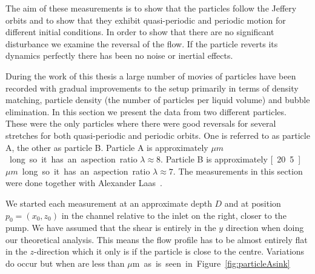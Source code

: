 The aim of these measurements is to show that the particles follow the Jeffery orbits and to show that they exhibit quasi-periodic and periodic motion for different initial conditions. In order to show that there are no significant disturbance we examine the reversal of the flow. If the particle reverts its dynamics perfectly there has been no noise or inertial effects.

During the work of this thesis a large number of movies of particles have been recorded with gradual improvements to the setup primarily in terms of density matching, particle density (the number of particles per liquid volume) and  bubble elimination. In this section we present the data from two different particles. These were the only particles where there were good reversals for several stretches for both quasi-periodic and periodic orbits. One is referred to as particle A, the other as particle B. Particle A is approximately \unit[24]{$\mu m$} long so it has an aspection ratio $\lambda \approx 8$. Particle B is approximately \unit[20.5]{$\mu m$} long so it has an aspection ratio $\lambda \approx 7$. The measurements in this section were done together with Alexander Laas~\cite{alexanderThesis}.

We started each measurement at an approximate depth $D$ and at position $p_0 = (x_0, z_0)$ in the channel relative to the inlet on the right, closer to the pump. We have assumed that the shear is entirely in the $y$ direction when doing 	our theoretical analysis. This means the flow profile has to be almost entirely flat in the $z$-direction which it only is if the particle is close to the centre. Variations do occur but when are less than \unit[10]{$\mu$m} as is seen in Figure \ref{fig:particleAsink}.

\newpage